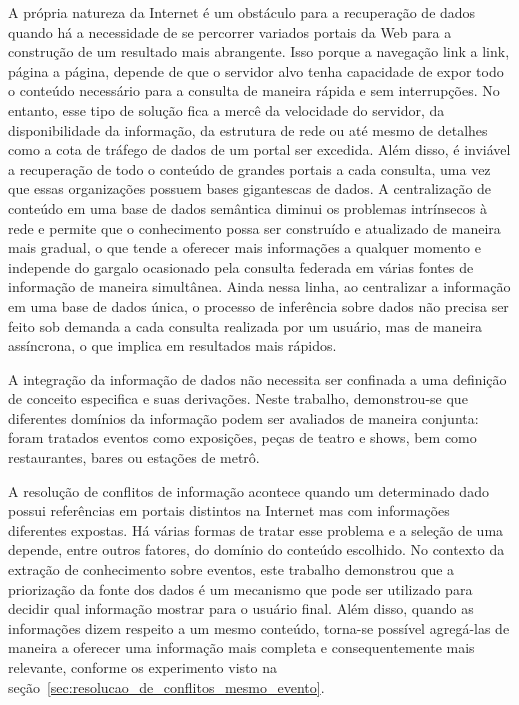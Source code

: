 A própria natureza da Internet é um obstáculo para a recuperação de dados quando há a necessidade de se percorrer variados portais da Web para a construção de um resultado mais abrangente. Isso porque a navegação link a link, página a página, depende de que o servidor alvo tenha capacidade de expor todo o conteúdo necessário para a consulta de maneira rápida e sem interrupções. No entanto, esse tipo de solução fica a mercê da velocidade do servidor, da disponibilidade da informação, da estrutura de rede ou até mesmo de detalhes como a cota de tráfego de dados de um portal ser excedida. Além disso, é inviável a recuperação de todo o conteúdo de grandes portais a cada consulta, uma vez que essas organizações possuem bases gigantescas de dados. A centralização de conteúdo em uma base de dados semântica  diminui os problemas intrínsecos à rede e permite que o conhecimento possa ser construído e atualizado de maneira mais gradual, o que tende a oferecer mais informações a qualquer momento e independe do gargalo ocasionado pela consulta federada em várias fontes de informação de maneira simultânea. Ainda nessa linha, ao centralizar a informação em uma base de dados única, o processo de inferência sobre dados não precisa ser feito sob demanda a cada consulta realizada por um usuário, mas de maneira assíncrona, o que implica em resultados mais rápidos.

A integração da informação de dados não necessita ser confinada a uma definição de conceito especifica e suas derivações. Neste trabalho, demonstrou-se que diferentes domínios da informação podem ser avaliados de maneira conjunta: foram tratados eventos como exposições, peças de teatro e shows, bem como restaurantes, bares ou estações de metrô. 

A resolução de conflitos de informação acontece quando um determinado dado possui referências em portais distintos na Internet mas com informações diferentes expostas. Há várias formas de tratar esse problema e a seleção de uma depende, entre outros fatores, do domínio do conteúdo escolhido. No contexto da extração de conhecimento sobre eventos, este trabalho demonstrou que a priorização da fonte dos dados é um mecanismo que pode ser utilizado para decidir qual informação mostrar para o usuário final. Além disso, quando as informações dizem respeito a um mesmo conteúdo, torna-se possível agregá-las de maneira a oferecer uma informação mais completa e consequentemente mais relevante, conforme os experimento visto na seção~\ref{sec:resolucao_de_conflitos_mesmo_evento}.

